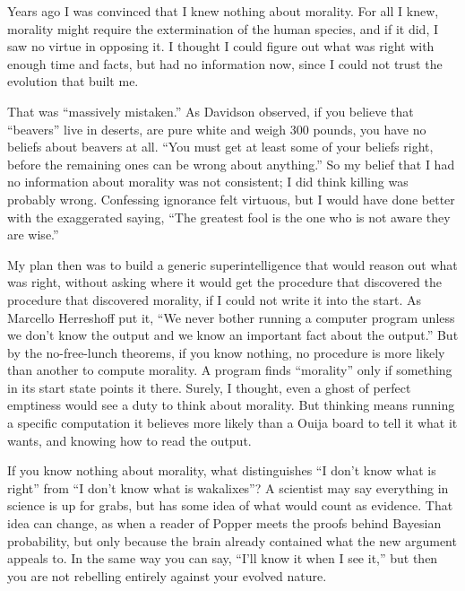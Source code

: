 
Years ago I was convinced that I knew nothing about morality. For all I knew, morality might require the extermination of the human species, and if it did, I saw no virtue in opposing it. I thought I could figure out what was right with enough time and facts, but had no information now, since I could not trust the evolution that built me.

That was ``massively mistaken.'' As Davidson observed, if you believe that ``beavers'' live in deserts, are pure white and weigh 300 pounds, you have no beliefs about beavers at all. ``You must get at least some of your beliefs right, before the remaining ones can be wrong about anything.''  So my belief that I had no information about morality was not consistent; I did think killing was probably wrong. Confessing ignorance felt virtuous, but I would have done better with the exaggerated saying, ``The greatest fool is the one who is not aware they are wise.''

My plan then was to build a generic superintelligence that would reason out what was right, without asking where it would get the procedure that discovered the procedure that discovered morality, if I could not write it into the start. As Marcello Herreshoff put it, ``We never bother running a computer program unless we don't know the output and we know an important fact about the output.'' But by the no-free-lunch theorems, if you know nothing, no procedure is more likely than another to compute morality. A program finds ``morality'' only if something in its start state points it there. Surely, I thought, even a ghost of perfect emptiness would see a duty to think about morality. But thinking means running a specific computation it believes more likely than a Ouija board to tell it what it wants, and knowing how to read the output.

If you know nothing about morality, what distinguishes ``I don't know what is right'' from ``I don't know what is wakalixes''? A scientist may say everything in science is up for grabs, but has some idea of what would count as evidence. That idea can change, as when a reader of Popper meets the proofs behind Bayesian probability, but only because the brain already contained what the new argument appeals to. In the same way you can say, ``I'll know it when I see it,'' but then you are not rebelling entirely against your evolved nature.

